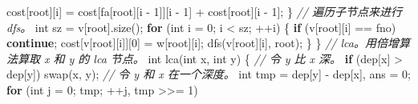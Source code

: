 \documentclass[
]{article}
\newenvironment{Shaded}{}{}
\newcommand{\CommentTok}[1]{\textcolor[rgb]{0.38,0.63,0.69}{\textit{#1}}}
\newcommand{\ControlFlowTok}[1]{\textcolor[rgb]{0.00,0.44,0.13}{\textbf{#1}}}
\newcommand{\DataTypeTok}[1]{\textcolor[rgb]{0.56,0.13,0.00}{#1}}
\newcommand{\DecValTok}[1]{\textcolor[rgb]{0.25,0.63,0.44}{#1}}
\newcommand{\NormalTok}[1]{#1}
\newcommand{\OperatorTok}[1]{\textcolor[rgb]{0.40,0.40,0.40}{#1}}
\begin{document}
\begin{Shaded}
\begin{Highlighting}[]
\NormalTok{    cost}\OperatorTok{[}\NormalTok{root}\OperatorTok{][}\NormalTok{i}\OperatorTok{]} \OperatorTok{=}\NormalTok{ cost}\OperatorTok{[}\NormalTok{fa}\OperatorTok{[}\NormalTok{root}\OperatorTok{][}\NormalTok{i }\OperatorTok{{-}} \DecValTok{1}\OperatorTok{]][}\NormalTok{i }\OperatorTok{{-}} \DecValTok{1}\OperatorTok{]} \OperatorTok{+}\NormalTok{ cost}\OperatorTok{[}\NormalTok{root}\OperatorTok{][}\NormalTok{i }\OperatorTok{{-}} \DecValTok{1}\OperatorTok{];}
  \OperatorTok{\}}
  \CommentTok{// 遍历子节点来进行 dfs。}
  \DataTypeTok{int}\NormalTok{ sz }\OperatorTok{=}\NormalTok{ v}\OperatorTok{[}\NormalTok{root}\OperatorTok{].}\NormalTok{size}\OperatorTok{();}
  \ControlFlowTok{for} \OperatorTok{(}\DataTypeTok{int}\NormalTok{ i }\OperatorTok{=} \DecValTok{0}\OperatorTok{;}\NormalTok{ i }\OperatorTok{\textless{}}\NormalTok{ sz}\OperatorTok{;} \OperatorTok{++}\NormalTok{i}\OperatorTok{)} \OperatorTok{\{}
    \ControlFlowTok{if} \OperatorTok{(}\NormalTok{v}\OperatorTok{[}\NormalTok{root}\OperatorTok{][}\NormalTok{i}\OperatorTok{]} \OperatorTok{==}\NormalTok{ fno}\OperatorTok{)} \ControlFlowTok{continue}\OperatorTok{;}
\NormalTok{    cost}\OperatorTok{[}\NormalTok{v}\OperatorTok{[}\NormalTok{root}\OperatorTok{][}\NormalTok{i}\OperatorTok{]][}\DecValTok{0}\OperatorTok{]} \OperatorTok{=}\NormalTok{ w}\OperatorTok{[}\NormalTok{root}\OperatorTok{][}\NormalTok{i}\OperatorTok{];}
\NormalTok{    dfs}\OperatorTok{(}\NormalTok{v}\OperatorTok{[}\NormalTok{root}\OperatorTok{][}\NormalTok{i}\OperatorTok{],}\NormalTok{ root}\OperatorTok{);}
  \OperatorTok{\}}
\OperatorTok{\}}
\CommentTok{// lca。用倍增算法算取 x 和 y 的 lca 节点。}
\DataTypeTok{int}\NormalTok{ lca}\OperatorTok{(}\DataTypeTok{int}\NormalTok{ x}\OperatorTok{,} \DataTypeTok{int}\NormalTok{ y}\OperatorTok{)} \OperatorTok{\{}
  \CommentTok{// 令 y 比 x 深。}
  \ControlFlowTok{if} \OperatorTok{(}\NormalTok{dep}\OperatorTok{[}\NormalTok{x}\OperatorTok{]} \OperatorTok{\textgreater{}}\NormalTok{ dep}\OperatorTok{[}\NormalTok{y}\OperatorTok{])}\NormalTok{ swap}\OperatorTok{(}\NormalTok{x}\OperatorTok{,}\NormalTok{ y}\OperatorTok{);}
  \CommentTok{// 令 y 和 x 在一个深度。}
  \DataTypeTok{int}\NormalTok{ tmp }\OperatorTok{=}\NormalTok{ dep}\OperatorTok{[}\NormalTok{y}\OperatorTok{]} \OperatorTok{{-}}\NormalTok{ dep}\OperatorTok{[}\NormalTok{x}\OperatorTok{],}\NormalTok{ ans }\OperatorTok{=} \DecValTok{0}\OperatorTok{;}
  \ControlFlowTok{for} \OperatorTok{(}\DataTypeTok{int}\NormalTok{ j }\OperatorTok{=} \DecValTok{0}\OperatorTok{;}\NormalTok{ tmp}\OperatorTok{;} \OperatorTok{++}\NormalTok{j}\OperatorTok{,}\NormalTok{ tmp }\OperatorTok{\textgreater{}\textgreater{}=} \DecValTok{1}\OperatorTok{)}

\end{Highlighting}
\end{Shaded}
\end{document}
